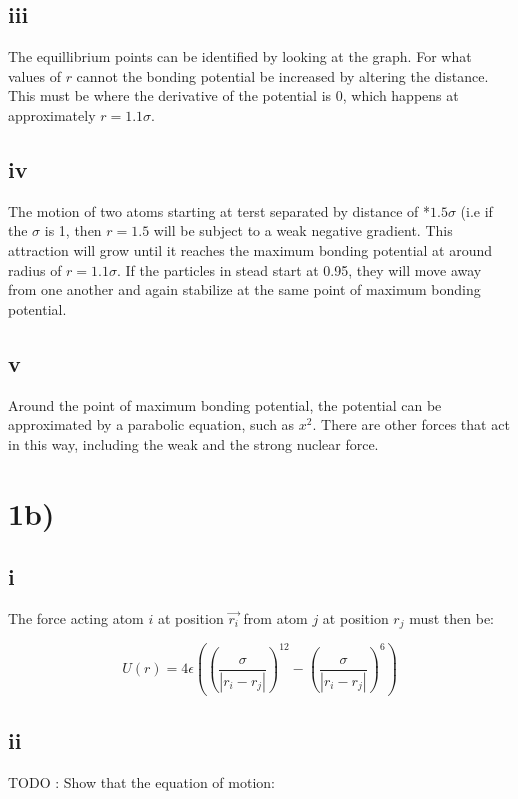 \subsection*{iii}
The equillibrium points can be identified by looking at the graph. For what values of $r$ cannot the bonding potential be increased by altering the distance. This must be where the derivative of the potential is 0, which happens at approximately $r = 1.1\sigma$. 

\subsection*{iv}
The motion of two atoms starting at terst separated by distance of *$1.5 \sigma$ (i.e if the $\sigma$ is 1, then $r = 1.5$  will be subject to a weak negative gradient. This attraction will grow until it reaches the maximum bonding potential at around radius of $r = 1.1 \sigma$.
If the particles in stead start at 0.95, they will move away from one another and again stabilize at the same point of maximum bonding potential.

\subsection*{v}
Around the point of maximum bonding potential, the potential can be approximated by a parabolic equation, such as $x^2$. There are other forces that act in this way, including the weak and the strong nuclear force.

\section*{1b)}

\subsection*{i}
The force acting atom $i$ at position $\vec{r_i}$ from atom $j$ at position $r_j$ must then be:

\begin{equation}
U(r) = 4\epsilon \left(   (\frac{\sigma}{| r_i - r_j | })^{12} -   (\frac{\sigma}{| r_i - r_j | })^6 \right)
\end{equation}

\subsection*{ii}
TODO : Show that the equation of motion:



